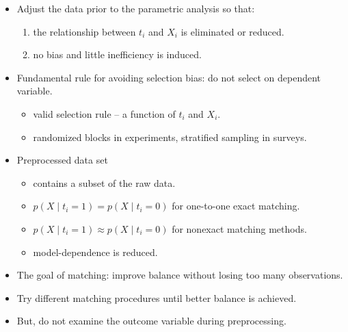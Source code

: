 \documentclass[20pt,landscape,pdftex]{foils}
\begin{document}
\begin{itemize}
\item Adjust the data prior to the parametric analysis so that:\pause
  \begin{enumerate}
  \item the relationship between $t_i$ and $X_i$ is eliminated or reduced.\pause
  \item no bias and little inefficiency is induced.\pause
  \end{enumerate}

\item Fundamental rule for avoiding selection bias: do not select on
  dependent variable.\pause 
  \begin{itemize}
  \item valid selection rule -- a function of $t_i$ and $X_i$.\pause 
  \item randomized blocks in experiments, stratified sampling in
    surveys.\pause
  \end{itemize}

\item Preprocessed data set\pause
  \begin{itemize}
  \item contains a subset of the raw data.\pause
  \item $p(X\mid t_i=1) = p(X\mid t_i=0)$ for one-to-one exact
    matching.\pause
  \item $p(X\mid t_i=1) \approx p(X\mid t_i=0)$ for nonexact matching
    methods.\pause 
  \item model-dependence is reduced.\pause
  \end{itemize}
\end{itemize}



\hypersetup{pdfpagetransition=Replace}

\begin{itemize}
\zerolistvertdimens 
\item The goal of matching: improve balance without losing too many
  observations.\pause

\item Try different matching procedures until better balance is
  achieved.\pause

\item But, do not examine the outcome variable during
  preprocessing.\pause
\end{itemize}
  
\end{document}
